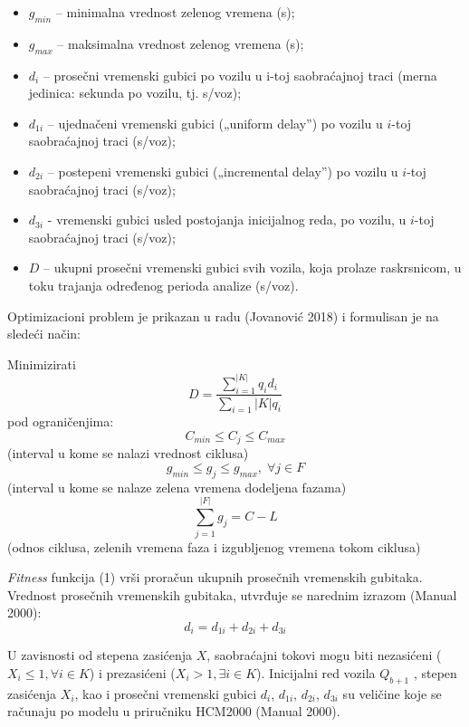 \begin{itemize}
    \item $g_{min}$ -- minimalna vrednost zelenog vremena (s);
    \item $g_{max}$ -- maksimalna vrednost zelenog vremena (s);
    \item $d_i$ -- prosečni vremenski gubici po vozilu u i-toj saobraćajnoj traci (merna jedinica: sekunda po vozilu, tj. s/voz);
    \item $d_{1i}$ -- ujednačeni vremenski gubici („uniform delay”) po vozilu u $i$-toj saobraćajnoj traci (s/voz);
    \item $d_{2i}$ -- postepeni vremenski gubici („incremental delay”) po vozilu u $i$-toj saobraćajnoj traci (s/voz);
    \item $d_{3i}$ - vremenski gubici usled postojanja inicijalnog reda, po vozilu, u $i$-toj saobraćajnoj traci (s/voz);
    \item $D$ -- ukupni prosečni vremenski gubici svih vozila, koja prolaze raskrsnicom, u toku trajanja određenog perioda analize (s/voz).
\end{itemize}

Optimizacioni problem je prikazan u radu (Jovanović 2018) i formulisan je na sledeći način:

Minimizirati
\begin{equation}
    D = \frac{\sum_{i=1}^{|K|} q_i d_i}{\sum_{i=1}{|K|} q_i}
\end{equation}
pod ograničenjima:
\begin{equation}
    C_{min} \leq C_j \leq C_{max}
\end{equation}
(interval u kome se nalazi vrednost ciklusa)
\begin{equation}
    g_{min} \leq g_j \leq g_{max}, \; \forall j \in F
\end{equation}
(interval u kome se nalaze zelena vremena dodeljena fazama)
\begin{equation}
    \sum_{j=1}^{|F|} g_j = C-L
\end{equation}
(odnos  ciklusa, zelenih vremena faza i izgubljenog vremena tokom ciklusa)

\emph{Fitness} funkcija (1) vrši proračun ukupnih prosečnih vremenskih gubitaka. Vrednost prosečnih vremenskih gubitaka, utvrđuje se narednim izrazom (Manual 2000):
\begin{equation*}
    d_i = d_{1i} + d_{2i} + d_{3i}
\end{equation*}

U zavisnosti od stepena zasićenja $X$, saobraćajni tokovi mogu biti nezasićeni ($X_i \leq 1, \forall i \in K$) i prezasićeni ($X_i > 1, \exists i \in K$). Inicijalni red vozila $Q_{b+1}$ , stepen zasićenja $X_i$, kao i prosečni vremenski gubici $d_i$, $d_{1i}$, $d_{2i}$, $d_{3i}$ su veličine koje se računaju po modelu u priručniku HCM2000 (Manual 2000).

